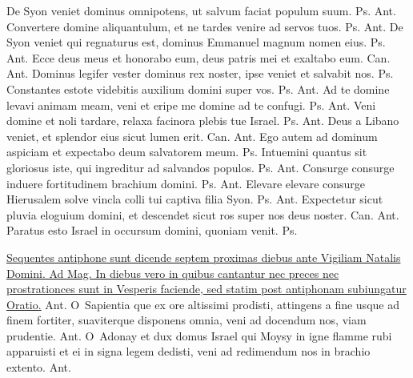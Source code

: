 \begin{multicols*}{2}
 De Syon veniet dominus omnipotens, ut salvum faciat populum suum. {\color{Red} Ps.}  {\color{Red} Ant.} Convertere domine aliquantulum, et ne tardes venire ad servos tuos. {\color{Red} Ps.}  {\color{Red} Ant.} De Syon veniet qui regnaturus est, dominus Emmanuel magnum nomen eius. {\color{Red} Ps.}  {\color{Red} Ant.} Ecce deus meus et honorabo eum, deus patris mei et exaltabo eum. {\color{Red} Can.}  {\color{Red} Ant.} Dominus legifer vester dominus rex noster, ipse veniet et salvabit nos. {\color{Red} Ps.} 
 Constantes estote videbitis auxilium domini super vos. {\color{Red} Ps.}  {\color{Red} Ant.} Ad te domine levavi animam meam, veni et eripe me domine ad te confugi. {\color{Red} Ps.}  {\color{Red} Ant.} Veni domine et noli tardare, relaxa facinora plebis tue Israel. {\color{Red} Ps.}  {\color{Red} Ant.} Deus a Libano veniet, et splendor eius sicut lumen erit. {\color{Red} Can.}  {\color{Red} Ant.} Ego autem ad dominum aspiciam et expectabo deum salvatorem meum. {\color{Red} Ps.} 
 Intuemini quantus sit gloriosus iste, qui ingreditur ad salvandos populos. {\color{Red} Ps.}  {\color{Red} Ant.} Consurge consurge induere fortitudinem brachium domini. {\color{Red} Ps.}  {\color{Red} Ant.} Elevare elevare consurge Hierusalem solve vincla colli tui captiva filia Syon. {\color{Red} Ps.}  {\color{Red} Ant.} Expectetur sicut pluvia eloguium domini, et descendet sicut ros super nos deus noster. {\color{Red} Can.}  {\color{Red} Ant.} Paratus esto Israel in occursum domini, quoniam venit. {\color{Red} Ps.} 
{\color{Red} }
\par \noindent \ul{Sequentes antiphone sunt dicende septem proximas diebus ante Vigiliam Natalis Domini. Ad Mag. In diebus vero in quibus cantantur nec preces nec prostrationces sunt in Vesperis faciende, sed statim post antiphonam subiungatur Oratio.} {\color{Red} Ant.}
\lettrine[lines=2]{\zallmancaps \color{Red} O}{}\ Sapientia que ex ore altissimi prodisti, attingens a fine usque ad finem fortiter, suaviterque disponens omnia, veni ad docendum nos, viam prudentie. {\color{Red} Ant.}
\lettrine[lines=2]{\zallmancaps \color{Blue} O}{}\ Adonay et dux domus Israel qui Moysy in igne flamme rubi apparuisti et ei in signa legem dedisti, veni ad redimendum nos in brachio extento. {\color{Red} Ant.}

\end{multicols*}
